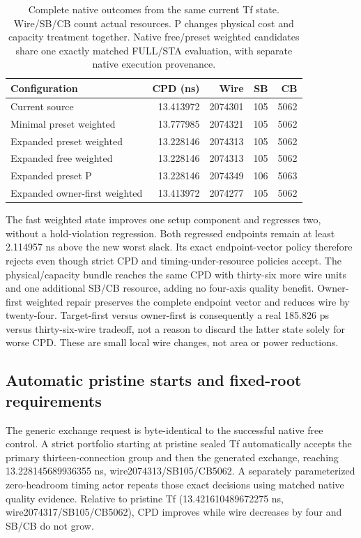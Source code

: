 \begin{table}[t]
\centering\small
\caption{Complete native outcomes from the same current Tf state. Wire/SB/CB count actual resources. P changes physical cost and capacity treatment together. Native free/preset weighted candidates share one exactly matched FULL/STA evaluation, with separate native execution provenance.}
\begin{tabular}{lrrrr}
\hline
Configuration & CPD (ns) & Wire & SB & CB\\
\hline
Current source & 13.413972 & 2074301 & 105 & 5062\\
Minimal preset weighted & 13.777985 & 2074321 & 105 & 5062\\
Expanded preset weighted & 13.228146 & 2074313 & 105 & 5062\\
Expanded free weighted & 13.228146 & 2074313 & 105 & 5062\\
Expanded preset P & 13.228146 & 2074349 & 106 & 5063\\
Expanded owner-first weighted & 13.413972 & 2074277 & 105 & 5062\\
\hline
\end{tabular}
\end{table}

The fast weighted state improves one setup component and regresses two, without a hold-violation regression. Both regressed endpoints remain at least 2.114957 ns above the new worst slack. Its exact endpoint-vector policy therefore rejects even though strict CPD and timing-under-resource policies accept. The physical/capacity bundle reaches the same CPD with thirty-six more wire units and one additional SB/CB resource, adding no four-axis quality benefit. Owner-first weighted repair preserves the complete endpoint vector and reduces wire by twenty-four. Target-first versus owner-first is consequently a real 185.826 ps versus thirty-six-wire tradeoff, not a reason to discard the latter state solely for worse CPD. These are small local wire changes, not area or power reductions.

\subsection{Automatic pristine starts and fixed-root requirements}
The generic exchange request is byte-identical to the successful native free control. A strict portfolio starting at pristine sealed Tf automatically accepts the primary thirteen-connection group and then the generated exchange, reaching 13.228145689936355 ns, wire2074313/SB105/CB5062. A separately parameterized zero-headroom timing actor repeats those exact decisions using matched native quality evidence. Relative to pristine Tf (13.421610489672275 ns, wire2074317/SB105/CB5062), CPD improves while wire decreases by four and SB/CB do not grow.

